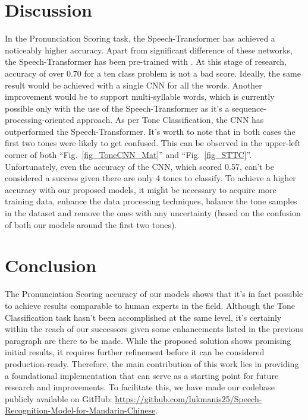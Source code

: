\documentclass[conference]{IEEEtran}
\begin{document}
\section{Discussion}
In the Pronunciation Scoring task, the Speech-Transformer has achieved a noticeably higher accuracy. Apart from significant difference of these networks, the Speech-Transformer has been pre-trained with \cite{shi2021aishell3multispeakermandarintts}. At this stage of research, accuracy of over 0.70 for a ten class problem is not a bad score. Ideally, the same result would be achieved with a single CNN for all the words.
Another improvement would be to support multi-syllable words, which is currently possible only with the use of the Speech-Transformer as it's a sequence-processing-oriented approach.
As per Tone Classification, the CNN has outperformed the Speech-Transformer. It's worth to note that in both cases the first two tones were likely to get confused. This can be observed in the upper-left corner of both ``Fig.~\ref{fig_ToneCNN_Mat}'' and ``Fig.~\ref{fig_STTC}''. Unfortunately, even the accuracy of the CNN, which scored 0.57, can't be considered a success given there are only 4 tones to classify. To achieve a higher accuracy with our proposed models, it might be necessary to acquire more training data, enhance the data processing techniques, balance the tone samples in the dataset and remove the ones with any uncertainty (based on the confusion of both our models around the first two tones).

\section{Conclusion}
The Pronunciation Scoring accuracy of our models shows that it's in fact possible to achieve results comparable to human experts in the field. Although the Tone Classification task hasn't been accomplished at the same level, it's certainly within the reach of our successors given some enhancements listed in the previous paragraph are there to be made.
While the proposed solution shows promising initial results, it requires further refinement before it can be considered production-ready. Therefore, the main contribution of this work lies in providing a foundational implementation that can serve as a starting point for future research and improvements. To facilitate this, we have made our codebase publicly available on GitHub: \href{https://github.com/lukmanis25/Speech-Recognition-Model-for-Mandarin-Chinese}{https://github.com/lukmanis25/Speech-Recognition-Model-for-Mandarin-Chinese}.
\end{document}
